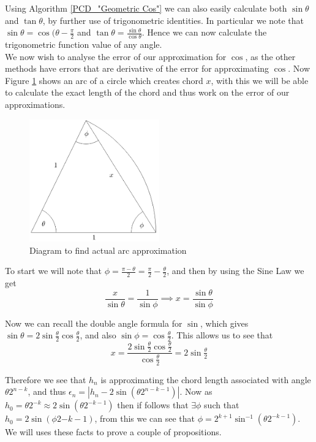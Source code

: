 Using Algorithm \ref{PCD_"Geometric Cos"} we can also easily calculate both \(\sin\theta\) and \(\tan\theta\), by further use of trigonometric identities. In particular we note that \(\sin\theta = \cos(\theta - \frac{\pi}{2}\) and \(\tan\theta = \frac{\sin\theta}{\cos\theta}\). Hence we can now calculate the trigonometric function value of any angle.\\

We now wish to analyse the error of our approximation for \(\cos\), as the other methods have errors that are derivative of the error for approximating \(\cos\). Now Figure \ref{FIG_"Geometric Trig 4"} shows an arc of a circle which creates chord \(x\), with this we will be able to calculate the exact length of the chord and thus work on the error of our approximations.\\

\begin{figure}[!ht]
	\caption{Diagram to find actual arc approximation}
	\label{FIG_"Geometric Trig 4"}
	\centering
	\includegraphics[width=0.5\textwidth]{"./Diagrams/Geometric Trig Diagram 4"}
\end{figure}

To start we will note that \(\phi = \frac{\pi - \theta}{2} = \frac{\pi}{2} - \frac{\theta}{2}\), and then by using the Sine Law we get 
\[\frac{x}{\sin\theta} = \frac{1}{\sin\phi} \implies x = \frac{\sin\theta}{\sin\phi}\]

Now we can recall the double angle formula for \(\sin\), which gives \(\sin\theta = 2\sin\frac{\theta}{2}\cos\frac{\theta}{2}\), and also \(\sin\phi = \cos\frac{\theta}{2}\). This allows us to see that
\[x = \frac{2\sin\frac{\theta}{2}\cos\frac{\theta}{2}}{\cos\frac{\theta}{2}} = 2\sin\tfrac{\theta}{2}\]

Therefore we see that \(h_n\) is approximating the chord length associated with angle \(\theta2^{n-k}\), and thus \(\epsilon_n = |h_n - 2\sin(\theta2^{n-k-1})|\). Now as \(h_0 =\theta2^{-k} \approx 2\sin(\theta2^{-k-1})\) then if follows that \(\exists \phi\) such that \(h_0 = 2\sin(\phi2{-k-1})\), from this we can see that \(\phi = 2^{k+1}\sin^{-1}(\theta2^{-k-1})\). We will uses these facts to prove a couple of propositions.

